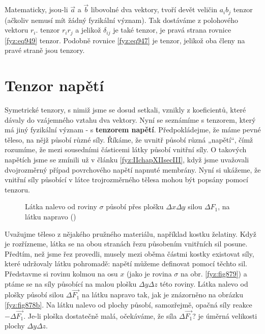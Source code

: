     Matematicky, jsou-li \(\vec{a}\) a \(\vec{b}\) libovolné dva vektory, tvoří devět veličin
    \(a_ib_j\) tenzor (ačkoliv nemusí mít žádný fyzikální význam). Tak dostáváme z polohového
    vektoru \(r_i\). tenzor \(r_ir_j\) a jelikož \(\delta_{ij}\) je také tenzor, je pravá strana
    rovnice \eqref{fyz:eq949} tenzor. Podobně rovnice \eqref{fyz:eq947} je tenzor, jelikož oba členy
    na pravé straně jsou tenzory.

  \section{Tenzor napětí}\label{fyz:IIchapXXXIsecVI} 

    Symetrické tenzory, s nimiž jsme se dosud setkali, vznikly z koeficientů, které dávaly do
    vzájemného vztahu dva vektory. Nyní se seznámíme s tenzorem, který má jiný fyzikální význam - s
    \textbf{tenzorem napětí}. Předpokládejme, že máme pevné těleso, na nějž působí různé síly.
    Říkáme, že uvnitř působí různá „napětí“, čímž rozumíme, že mezi sousedními částicemi látky
    působí vnitřní síly. O takových napětích jsme se zmínili už v článku \ref{fyz:IIchapXIIsecIII},
    když jsme uvažovali dvojrozměrný případ povrchového napětí napnuté membrány. Nyní si ukážeme, že
    vnitřní síly působící v látce trojrozměrného tělesa mohou být popsány pomocí tenzoru.

    \begin{figure}[ht!] %
      \centering
      \caption{Látka nalevo od roviny \(\sigma\) působí přes plošku \(\Delta x\Delta y\) silou
              \(\Delta F_1\), na látku napravo (\cite[s.~583]{Feynman02})}
      \label{fyz:fig878}
    \end{figure}

    Uvažujme těleso z nějakého pružného materiálu, například kostku želatiny. Když je rozřízneme,
    látka se na obou stranách řezu působením vnitřních sil posune. Předtím, než jsme řez provedli,
    musely mezi oběma částmi kostky existovat síly, které udržovaly látku pohromadě: napětí můžeme
    definovat pomocí těchto sil. Představme si rovinu kolmou na osu \(x\) (jako je rovina \(\sigma\)
    na obr. \ref{fyz:fig879}) a ptáme se na síly působící na malou plošku \(\Delta y\Delta z\) této
    roviny. Látka nalevo od plošky působí silou \(Δ\vec{F_1}\) na látku napravo tak, jak je
    znázorněno na obrázku \ref{fyz:fig878b}. Na látku nalevo od plochy působí, samozřejmě, opačná síly
    reakce \(-Δ\vec{F_1}\). Je-li ploška dostatečně malá, očekáváme, že síla \(Δ\vec{F_1}\)? je
    úměrná velikosti plochy \(\Delta y\Delta z\).

